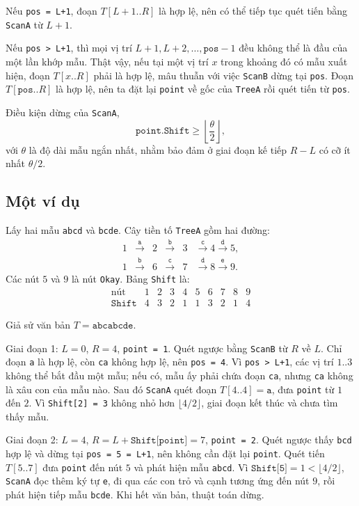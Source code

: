 \documentclass[11pt]{article}
\begin{document}
Nếu \texttt{pos = L+1}, đoạn $T[L+1..R]$ là hợp lệ, nên có thể tiếp tục quét
tiến bằng \texttt{ScanA} từ $L+1$.

Nếu \texttt{pos > L+1}, thì mọi vị trí $L+1,L+2,\ldots,\texttt{pos}-1$ đều
không thể là đầu của một lần khớp mẫu. Thật vậy, nếu tại một vị trí
$x$ trong khoảng đó có mẫu xuất hiện, đoạn $T[x..R]$ phải là hợp lệ, mâu
thuẫn với việc \texttt{ScanB} dừng tại \texttt{pos}. Đoạn $T[\texttt{pos}..R]$
là hợp lệ, nên ta đặt lại \texttt{point} về gốc của \texttt{TreeA} rồi quét
tiến từ \texttt{pos}.

Điều kiện dừng của \texttt{ScanA},
\[
  \texttt{point.Shift}\ge \left\lfloor\frac{\theta}{2}\right\rfloor,
\]
với $\theta$ là độ dài mẫu ngắn nhất, nhằm bảo đảm ở giai đoạn kế tiếp
$R-L$ có cỡ ít nhất $\theta/2$.

\subsection{Một ví dụ}

Lấy hai mẫu \texttt{abcd} và \texttt{bcde}. Cây tiền tố \texttt{TreeA} gồm hai
đường:
\[
\begin{array}{cccccc}
1&\xrightarrow{\texttt{a}}&2&\xrightarrow{\texttt{b}}&3&
\xrightarrow{\texttt{c}}4\xrightarrow{\texttt{d}}5,\\[0.4em]
1&\xrightarrow{\texttt{b}}&6&\xrightarrow{\texttt{c}}&7&
\xrightarrow{\texttt{d}}8\xrightarrow{\texttt{e}}9.
\end{array}
\]
Các nút $5$ và $9$ là nút \texttt{Okay}. Bảng \texttt{Shift} là:
\[
\begin{array}{c|ccccccccc}
\text{nút} & 1&2&3&4&5&6&7&8&9\\
\hline
\texttt{Shift} & 4&3&2&1&1&3&2&1&4
\end{array}
\]

Giả sử văn bản $T=\texttt{abcabcde}$.

Giai đoạn 1: $L=0$, $R=4$, \texttt{point = 1}. Quét ngược bằng \texttt{ScanB}
từ $R$ về $L$. Chỉ đoạn \texttt{a} là hợp lệ, còn \texttt{ca} không hợp lệ,
nên \texttt{pos = 4}. Vì \texttt{pos > L+1}, các vị trí $1..3$ không thể bắt
đầu một mẫu; nếu có, mẫu ấy phải chứa đoạn \texttt{ca}, nhưng \texttt{ca}
không là xâu con của mẫu nào. Sau đó \texttt{ScanA} quét đoạn
$T[4..4]=\texttt{a}$, đưa \texttt{point} từ $1$ đến $2$. Vì
\texttt{Shift[2] = 3} không nhỏ hơn $\lfloor 4/2\rfloor$, giai đoạn kết thúc
và chưa tìm thấy mẫu.

Giai đoạn 2: $L=4$, $R=L+\texttt{Shift[point]}=7$, \texttt{point = 2}. Quét
ngược thấy \texttt{bcd} hợp lệ và dừng tại \texttt{pos = 5 = L+1}, nên không
cần đặt lại \texttt{point}. Quét tiến $T[5..7]$ đưa \texttt{point} đến nút
$5$ và phát hiện mẫu \texttt{abcd}. Vì $\texttt{Shift[5]} = 1 <
\lfloor4/2\rfloor$, \texttt{ScanA} đọc thêm ký tự \texttt{e}, đi qua các con
trỏ và cạnh tương ứng đến nút $9$, rồi phát hiện tiếp mẫu \texttt{bcde}. Khi
hết văn bản, thuật toán dừng.
\end{document}
